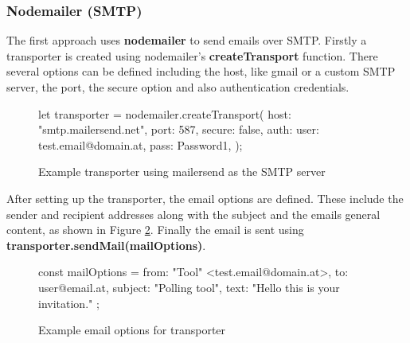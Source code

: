 \documentclass[a4paper,12pt]{report}
\begin{document}
\subsubsection{Nodemailer (SMTP)}
The first approach uses \textbf{nodemailer} to send emails over SMTP. Firstly a transporter is created using nodemailer's \textbf{createTransport} function. There several options can be defined including the host, like gmail or a custom SMTP server, the port, the secure option and also authentication credentials. 
\begin{figure}[H]
	\begin{code}
		let transporter = nodemailer.createTransport({
			host: "smtp.mailersend.net",
			port: 587,
			secure: false,
			auth: {
				user: test.email@domain.at,
				pass: Password1,
			}
		});
	\end{code}
	\caption{Example transporter using mailersend as the SMTP server}
	\label{fig:example-transporter}
\end{figure}
\noindent
After setting up the transporter, the email options are defined. These include the sender and recipient addresses along with the subject and the emails general content, as shown in Figure \ref{fig:example-mail-options-smtp}. Finally the email is sent using \textbf{transporter.sendMail(mailOptions)}.
\begin{figure}[H]
	\begin{code}
		const mailOptions = {
			from: "Tool" <test.email@domain.at>,
			to: user@email.at,
			subject: "Polling tool",
			text: "Hello this is your invitation."
		};
	\end{code}
	\caption{Example email options for transporter}
	\label{fig:example-mail-options-smtp}
\end{figure}
\end{document}
